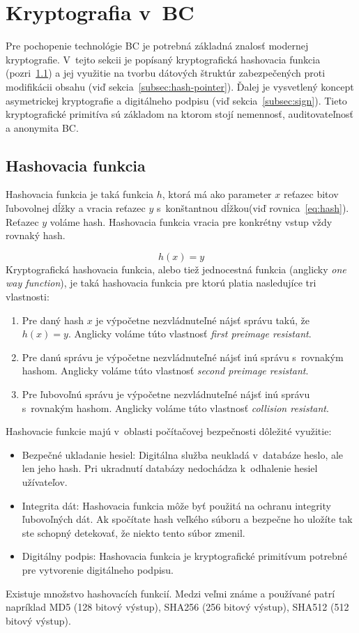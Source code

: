 \section{Kryptografia v~BC}\label{sec:crypto}
Pre pochopenie technológie BC je potrebná základná znalosť modernej kryptografie. V~tejto sekcii je popísaný kryptografická hashovacia funkcia (pozri~\ref{subsec:hash}) a jej využitie na tvorbu dátových štruktúr zabezpečených proti modifikácii obsahu (viď sekcia~\ref{subsec:hash-pointer}). Ďalej je vysvetlený koncept asymetrickej kryptografie a digitálneho podpisu (viď sekcia~\ref{subsec:sign}). Tieto kryptografické primitíva sú základom na ktorom stojí nemennosť, auditovateľnosť a anonymita BC.

\subsection{Hashovacia funkcia}\label{subsec:hash}
Hashovacia funkcia je taká funkcia $h$, ktorá má ako parameter $x$ reťazec bitov ľubovolnej dĺžky a vracia reťazec $y$ s~konštantnou dĺžkou(viď rovnica~\ref{eq:hash}). Reťazec $y$ voláme hash. Hashovacia funkcia vracia pre konkrétny vstup vždy rovnaký hash.

\begin{equation} \label{eq:hash}
	h(x) = y
\end{equation}
Kryptografická hashovacia funkcia, alebo tiež jednocestná funkcia (anglicky \textit{one way function}), je taká hashovacia funkcia pre ktorú platia nasledujíce tri vlastnosti:
\begin{enumerate}
	\item Pre daný hash $x$ je výpočetne nezvládnuteľné nájsť správu takú, že $ h(x) = y $. Anglicky voláme túto vlastnosť \textit{first preimage resistant}.
	\item Pre danú správu je výpočetne nezvládnuteľné nájsť inú správu s~rovnakým hashom. Anglicky voláme túto vlastnosť \textit{second preimage resistant}.
	\item Pre ľubovoľnú správu je výpočetne nezvládnuteľné nájsť inú správu s~rovnakým hashom. Anglicky voláme túto vlastnosť \textit{collision resistant}.
\end{enumerate}

Hashovacie funkcie majú v~oblasti počítačovej bezpečnosti dôležité využitie:
\begin{itemize}
	\item Bezpečné ukladanie hesiel: Digitálna služba neukladá v~databáze heslo, ale len jeho hash. Pri ukradnutí databázy nedochádza k~odhalenie hesiel užívateľov.
	\item Integrita dát: Hashovacia funkcia môže byť použitá na ochranu integrity ľubovoľných dát. Ak spočítate hash veľkého súboru a bezpečne ho uložíte tak ste schopný detekovať, že niekto tento súbor zmenil.
	\item Digitálny podpis: Hashovacia funkcia je kryptografické primitívum potrebné pre vytvorenie digitálneho podpisu.
\end{itemize}
Existuje množstvo hashovacích funkcií. Medzi veľmi známe a používané patrí napríklad MD5 (128 bitový výstup), SHA256 (256 bitový výstup), SHA512 (512 bitový výstup).~\cite{cryptoHandbook, nigelSmartCrypto}

